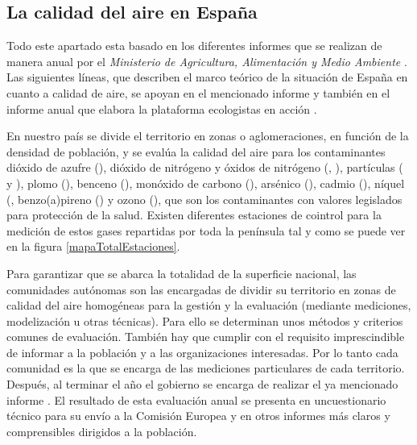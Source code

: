 \subsection{La calidad del aire en España}

Todo este apartado esta basado en los diferentes informes que se realizan de manera anual por el \textit{Ministerio de Agricultura, Alimentación y Medio Ambiente} \cite{informe_2018}. Las siguientes líneas, que describen el marco teórico de la situación de España en cuanto a calidad de aire, se apoyan en el mencionado informe y también en el informe anual que elabora la plataforma ecologistas en acción \cite{informe_ecologistas}.

 En nuestro país se divide el territorio en zonas o aglomeraciones, en función de la densidad de población, y se evalúa la calidad del aire para los contaminantes dióxido de azufre (), dióxido de nitrógeno y óxidos de nitrógeno (, ), partículas ( y ), plomo (), benceno (), monóxido de carbono (), arsénico (), cadmio (), níquel (, benzo(a)pireno () y ozono (), que son los contaminantes con valores legislados para protección de la salud. Existen diferentes estaciones de cointrol para la medición de estos gases repartidas por toda la península tal y como se puede ver en la figura \ref{mapaTotalEstaciones}.
 
 Para garantizar que se abarca la totalidad de la superficie nacional, las comunidades autónomas son las encargadas de dividir su territorio en zonas de calidad del aire homogéneas para la gestión y la evaluación (mediante mediciones, modelización u otras técnicas). Para ello se determinan unos métodos y criterios comunes de evaluación. También hay que cumplir con el requisito imprescindible de informar a la población y a las organizaciones interesadas. Por lo tanto cada comunidad es la que se encarga de las mediciones particulares de cada territorio. Después, al terminar el año el gobierno se encarga de realizar el ya mencionado informe \cite{informe_2018}. El resultado de esta evaluación anual se presenta en uncuestionario técnico para su envío a la Comisión Europea y en otros informes más claros y comprensibles dirigidos a la población.
 
 
 
 
